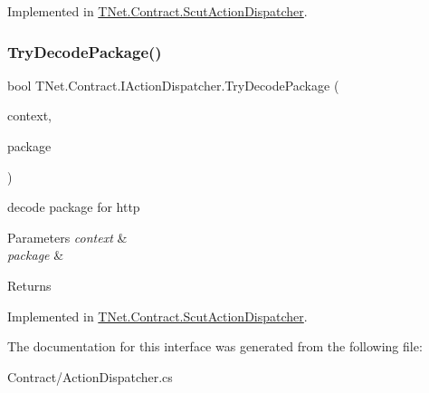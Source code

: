 Implemented in \mbox{\hyperlink{class_t_net_1_1_contract_1_1_scut_action_dispatcher_afdcd34dde1c7dcbe79569eea02676885}{T\+Net.\+Contract.\+Scut\+Action\+Dispatcher}}.

\mbox{\label{interface_t_net_1_1_contract_1_1_i_action_dispatcher_a8de9c448c00d87b1e5c5e97aa7304243}} 
\subsubsection{\texorpdfstring{Try\+Decode\+Package()}{TryDecodePackage()}\hspace{0.1cm}{\footnotesize\ttfamily [4/4]}}
{\footnotesize\ttfamily bool T\+Net.\+Contract.\+I\+Action\+Dispatcher.\+Try\+Decode\+Package (\begin{DoxyParamCaption}\item[{Http\+Context}]{context,  }\item[{out \mbox{\hyperlink{class_t_net_1_1_contract_1_1_request_package}{Request\+Package}}}]{package }\end{DoxyParamCaption})}



decode package for http 


\begin{DoxyParams}{Parameters}
{\em context} & \\
\hline
{\em package} & \\
\hline
\end{DoxyParams}
\begin{DoxyReturn}{Returns}

\end{DoxyReturn}


Implemented in \mbox{\hyperlink{class_t_net_1_1_contract_1_1_scut_action_dispatcher_a1419151e61eeff45c912074bbf820c26}{T\+Net.\+Contract.\+Scut\+Action\+Dispatcher}}.



The documentation for this interface was generated from the following file\+:\begin{DoxyCompactItemize}
\item 
Contract/Action\+Dispatcher.\+cs\end{DoxyCompactItemize}
